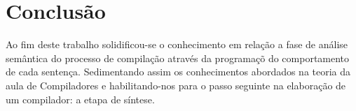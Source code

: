 \documentclass[a4paper,12pt]{report}
\begin{document}
\section{Conclus\~ao}

Ao fim deste trabalho solidificou-se o conhecimento em rela\c{c}\~ao a fase de 
an\'alise sem\^antica do processo de compila\c{c}\~ao atrav\'es da programa\c{c}\~o 
do comportamento de cada senten\c{c}a. Sedimentando assim os conhecimentos abordados
na teoria da aula de Compiladores e habilitando-nos para o passo seguinte na 
elabora\c{c}\~ao de um compilador: a etapa de s\'intese.
\end{document}
